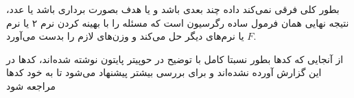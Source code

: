 \documentclass[a4paper, 12pt]{article}
\begin{document}
بطور کلی فرقی نمی‌کند داده چند بعدی باشد و یا هدف بصورت برداری باشد یا عدد، نتیجه نهایی همان فرمول ساده رگرسیون است که مسئله را با بهینه کردن نرم ۲ یا نرم 
$F$
یا نرم‌های دیگر
حل می‌کند و وزن‌های لازم را بدست می‌آورد. 


از آنجایی که کد‌ها بطور نسبتا کامل با توضیح در حوپیتر پایتون نوشته شده‌اند، کد‌ها در این گزارش آورده نشده‌اند و برای بررسی بیشتر پیشنهاد می‌شود تا به خود کد‌ها مراجعه شود
\end{document}
